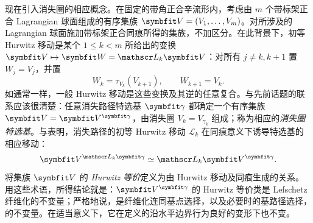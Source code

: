 现在引入消失圈的相应概念。在固定的带角正合辛流形内，考虑由 $m$ 个带标架正合 Lagrangian 球面组成的有序集族 $\symbfit V=(V_1,\ldots,V_m)$。对所涉及的 Lagrangian 球面施加带标架正合同痕所得的集族，不加区分。在此背景下，初等 Hurwitz 移动是某个 $1\leq k<m$ 所给出的变换 $\symbfit V\mapsto\symbfit W=\mathscr L_k\symbfit V$：对所有 $j\ne k,k+1$ 置 $W_j=V_j$，并置
\begin{equation}\label{eq:16.7}
W_k=\tau_{V_k}(V_{k+1}),\qquad W_{k+1}=V_k.
\end{equation}
如通常一样，一般 Hurwitz 移动是这些变换及其逆的任意复合。与先前话题的联系应该很清楚：任意消失路径特选基 $\symbfit\gamma$ 都确定一个有序集族 $\symbfit V=\symbfit V^{\symbfit\gamma}$，由消失圈 $V_k=V_{\gamma_k}$ 组成；称为相应的\emph{消失圈特选基}。与表明，消失路径的初等 Hurwitz 移动 $\mathscr L_k$ 在同痕意义下诱导特选基的相应移动：
\[
\symbfit V^{\mathscr L_k\symbfit\gamma}\simeq\mathscr L_k\symbfit V^{\symbfit\gamma}.
\]
将集族 $\symbfit V$ 的 \emph{Hurwitz 等价}定义为由 Hurwitz 移动及同痕生成的关系。用这些术语，所得结论就是：$\symbfit V^{\symbfit\gamma}$ 的 Hurwitz 等价类是 Lefschetz 纤维化的不变量；严格地说，是纤维化连同基点选择，以及必要时的基路径选择，的不变量。在适当意义下，它在定义的沿水平边界行为良好的变形下也不变。

